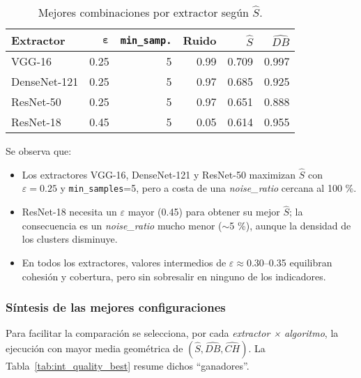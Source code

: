 \begin{table}[ht]
  \centering
  \caption{Mejores combinaciones por extractor según \(\widehat S\).}
  \label{tab:int_quality_dbscan_top}
  \begin{tabular}{lrrrrr}
    \hline
    \textbf{Extractor} & \(\boldsymbol{\varepsilon}\) &
    \texttt{min\_samp.} & \textbf{Ruido} &
    \(\widehat S\) & \(\widehat{DB}\) \\
    \hline
    VGG-16        & 0.25 & 5 & 0.99 & 0.709 & 0.997 \\
    DenseNet-121  & 0.25 & 5 & 0.97 & 0.685 & 0.925 \\
    ResNet-50     & 0.25 & 5 & 0.97 & 0.651 & 0.888 \\
    ResNet-18     & 0.45 & 5 & 0.05 & 0.614 & 0.955 \\
    \hline
  \end{tabular}
\end{table}

Se observa que:

\begin{itemize}
  \item Los extractores VGG-16, DenseNet-121 y ResNet-50 maximizan
        \(\widehat S\) con \(\varepsilon=0.25\) y
        \texttt{min\_samples}=5, pero a costa de una
        \textit{noise\_ratio} cercana al 100 \%.
  \item ResNet-18 necesita un \(\varepsilon\) mayor (0.45) para obtener
        su mejor \(\widehat S\); la consecuencia es un
        \textit{noise\_ratio} mucho menor (\(\sim\)5 \%),
        aunque la densidad de los clusters disminuye.
  \item En todos los extractores, valores intermedios de
        \(\varepsilon\approx0.30\)–0.35 equilibran cohesión y cobertura,
        pero sin sobresalir en ninguno de los indicadores.
\end{itemize}

\subsubsection{Síntesis de las mejores configuraciones}

Para facilitar la comparación se selecciona, por cada
\textit{extractor × algoritmo}, la ejecución con mayor media geométrica de
\((\widehat S,\widehat{DB},\widehat{CH})\).
La Tabla~\ref{tab:int_quality_best} resume dichos “ganadores”.


